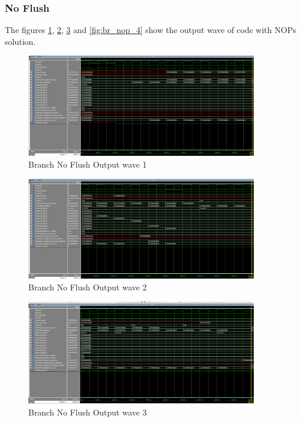 \subsubsection{No Flush}
The figures \ref{fig:br_nop_1}, \ref{fig:br_nop_2}, \ref{fig:br_nop_3} and \ref{fig:br_nop_4} show the output wave of code with NOPs solution.
\begin{figure}[H]
    \centering
    \includegraphics[width=0.9\textwidth]{images/test_cases/branch/Branch_no_flush_1.PNG}
    \caption{Branch No Flush Output wave 1}
    \label{fig:br_nop_1}
\end{figure}

\begin{figure}[H]
    \centering
    \includegraphics[width=0.9\textwidth]{images/test_cases/branch/Branch_no_flush_2.PNG}
    \caption{Branch No Flush Output wave 2}
    \label{fig:br_nop_2}
\end{figure}

\begin{figure}[H]
    \centering
    \includegraphics[width=0.9\textwidth]{images/test_cases/branch/Branch_no_flush_3.PNG}
    \caption{Branch No Flush Output wave 3}
    \label{fig:br_nop_3}
\end{figure}

